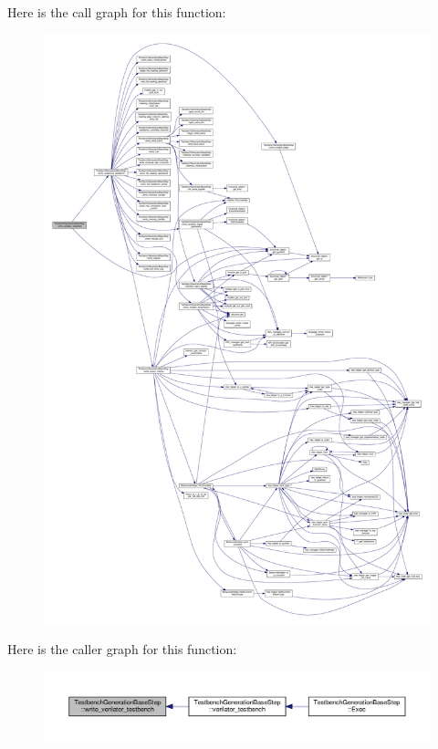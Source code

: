 Here is the call graph for this function\+:
\nopagebreak
\begin{figure}[H]
\begin{center}
\leavevmode
\includegraphics[width=350pt]{dc/d02/classTestbenchGenerationBaseStep_a58c9e59ffac01539a187a955b038413f_cgraph}
\end{center}
\end{figure}
Here is the caller graph for this function\+:
\nopagebreak
\begin{figure}[H]
\begin{center}
\leavevmode
\includegraphics[width=350pt]{dc/d02/classTestbenchGenerationBaseStep_a58c9e59ffac01539a187a955b038413f_icgraph}
\end{center}
\end{figure}


